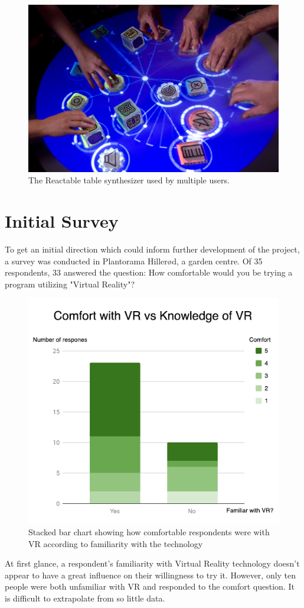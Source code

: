 				\begin{figure}[H]
					\centering
					\includegraphics[width=0.6\linewidth]{figure/Analysis/reactable}
					\caption{The Reactable table synthesizer used by multiple users.}
					\label{fig:reactable}
				\end{figure} 
		
		
			\section{Initial Survey}\label{sec:initialSurvey}
			
			To get an initial direction which could inform further development of the project, a survey was conducted in Plantorama Hillerød, a garden centre. Of 35 respondents, 33 answered the question: How comfortable would you be trying a program utilizing "Virtual Reality"?
			
			\begin{figure}[H]
				\centering
				\includegraphics[width=0.6\linewidth]{figure/Analysis/comfort.png}
				\caption{Stacked bar chart showing how comfortable respondents were with VR according to familiarity with the technology}
				\label{fig:comfort}
			\end{figure}
			
			At first glance, a respondent's familiarity with Virtual Reality technology doesn't appear to have a great influence on their willingness to try it. However, only ten people were both unfamiliar with VR and responded to the comfort question. It is difficult to extrapolate from so little data.
			
